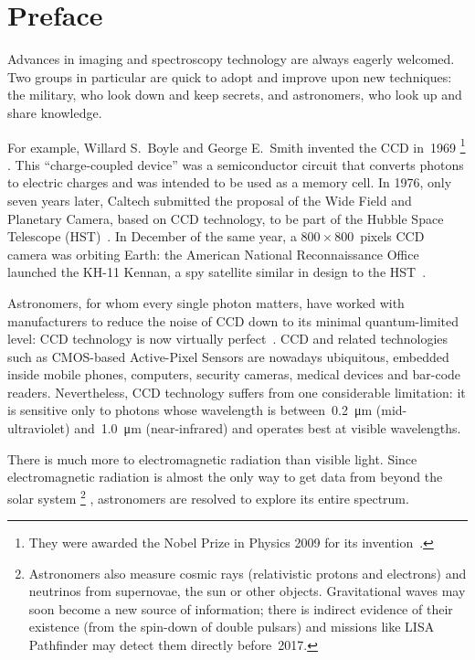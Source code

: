 \cleardoublepage
\chapter{Preface}
\label{sec:preface}

Advances in imaging and spectroscopy technology are always eagerly welcomed.
Two groups in particular are quick to adopt and improve upon new techniques: the military, who look down and keep secrets, and astronomers, who look up and share knowledge.

For example, Willard S.\ Boyle and George E.\ Smith invented the CCD in~1969%
\footnote{
   They were awarded the Nobel Prize in Physics 2009 for its invention~\parencite{nobel2009}.
}%
.
This ``charge-coupled device'' was a semiconductor circuit that converts photons to electric charges and was intended to be used as a memory cell.
In 1976, only seven years later,
Caltech submitted the proposal of the Wide Field and Planetary Camera,
based on CCD technology,
to be part of the Hubble Space Telescope (HST)~\parencite{leckrone1980space}.
In December of the same year, a $800\times800$~pixels CCD camera was orbiting Earth: the American National Reconnaissance Office launched the KH-11 Kennan, a spy satellite similar in design to the HST~\parencite[see references in][]{wiki:kh11kennan}.

Astronomers, for whom every single photon matters, have worked with manufacturers to reduce the noise of CCD down to its minimal quantum-limited level: CCD technology is now virtually perfect~\parencite{mackay2010}.
CCD and related technologies such as CMOS-based Active-Pixel Sensors are nowadays ubiquitous, embedded inside mobile phones, computers, security cameras, medical devices and bar-code readers.
Nevertheless, CCD technology suffers from one considerable limitation: it is sensitive only to photons whose wavelength is between~\SI{0.2}{\micro\meter} (mid-ultraviolet) and~\SI{1.0}{\micro\meter} (near-infrared) and operates best at visible wavelengths.

There is much more to electromagnetic radiation than visible light.
Since electromagnetic radiation is almost the only way to get data from beyond the solar system%
\footnote{
    Astronomers also measure cosmic rays (relativistic protons and electrons) and neutrinos from supernovae, the sun or other objects.
    Gravitational waves may soon become a new source of information;
    there is indirect evidence of their existence (from the spin-down of double pulsars) and missions like LISA Pathfinder may detect them directly before~2017.
}%
, astronomers are resolved to explore its entire spectrum.

